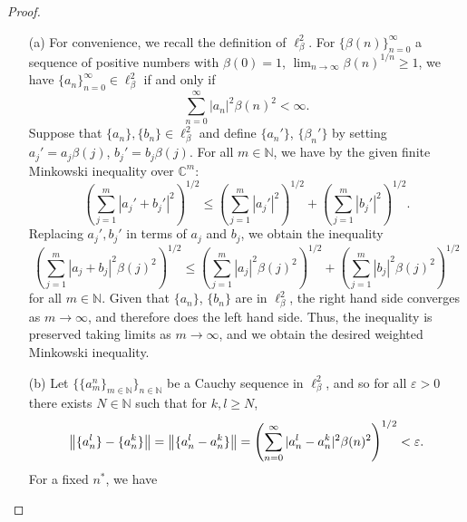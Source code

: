 \documentclass[12pt]{article}
\theoremstyle{definition}
\begin{document}
	\begin{proof} ~
		\begin{itemize}
			\item[(a)] For convenience, we recall the definition of $\ell_\beta^2$. For $\{\beta(n)\}_{n = 0}^\infty$ a sequence of positive numbers with $\beta(0) = 1$, $\lim_{n \to \infty} \beta(n)^{1/n} \geq 1$, we have $\{a_n\}_{n = 0}^\infty \in \ell_\beta^2$ if and only if $$\sum_{n = 0}^\infty |a_n|^2 \beta(n)^2 < \infty.$$ 
			Suppose that $\{a_n\}, \{b_n\} \in \ell_\beta^2$ and define $\{a_n'\}$, $\{\beta_n'\}$ by setting $a_j' = a_j \beta(j)$, $b_j' = b_j \beta(j)$. For all $m \in \mathbb{N}$, we have by the given finite Minkowski inequality over $\mathbb{C}^m$: $$\left(\sum_{j = 1}^m |a_j' + b_j'|^2\right)^{1/2} \leq \left(\sum_{j = 1}^m |a_j'|^2\right)^{1/2} + \left(\sum_{j = 1}^m |b_j'|^2\right)^{1/2}.$$ Replacing $a_j', b_j'$ in terms of $a_j$ and $b_j$, we obtain the inequality $$\left(\sum_{j = 1}^m |a_j + b_j|^2\beta(j)^2\right)^{1/2} \leq \left(\sum_{j = 1}^m |a_j|^2 \beta(j)^2\right)^{1/2} + \left(\sum_{j = 1}^m |b_j|^2 \beta(j)^2\right)^{1/2}$$ for all $m \in \mathbb{N}$. Given that $\{a_n\}$, $\{b_n\}$ are in $\ell_\beta^2$, the right hand side converges as $m \to \infty$, and therefore does the left hand side. Thus, the inequality is preserved taking limits as $m \to \infty$, and we obtain the desired weighted Minkowski inequality.
			
			\item[(b)] Let $\{\{a_m^n\}_{m \in \mathbb{N}}\}_{n \in \mathbb{N}}$ be a Cauchy sequence in $\ell_\beta^2$, and so for all $\varepsilon > 0$ there exists $N \in \mathbb{N}$ such that for $k, l \geq N$, $$\norm{\{a_n^l\} - \{a_n^k\}} = \norm{\{a_n^l - a_n^k\}} = \left(\sum_{n = 0}^\infty |a_n^l - a_n^k|^2 \beta(n)^2\right)^{1/2} < \varepsilon.$$ For a fixed $n^\ast$, we have $$$$ 
		\end{itemize}
	\end{proof}
\end{document}
